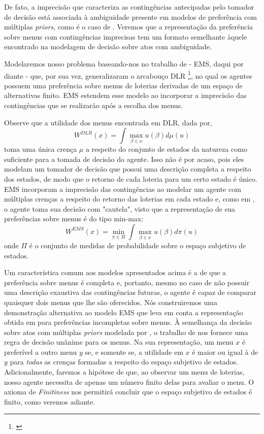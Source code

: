 \documentclass[11pt, a4paper]{article}
\theoremstyle{nonumberplain}
\theoremstyle{plain}
\theoremstyle{plain}
\theoremstyle{plain}
\begin{document}
De fato, a imprecisão que caracteriza as contingências antecipadas pelo tomador de decisão está associada à ambiguidade presente em modelos de preferência com múltiplas \emph{priors}, como é o caso de \cite{Gilboa1989}. Veremos que a representação da preferência sobre menus com contingências imprecisas tem um formato semelhante àquele encontrado na modelagem de decisão sobre atos com ambiguidade.   

Modelaremos nosso problema baseando-nos no trabalho de \cite{Epstein2007} - EMS, daqui por diante - que, por sua vez, generalizaram o arcabouço DLR \footnote{\cite{Dekel2001}}, no qual os agentes possuem uma preferência sobre menus de loterias derivadas de um espaço de alternativas finito. EMS estendem esse modelo ao incorporar a imprecisão das contingências que se realizarão após a escolha dos menus. 

Observe que a utilidade dos menus encontrada em DLR, dada por,               
$$ W^{DLR}(x)=\int \max_{\beta\in x}u(\beta)d\mu(u) $$
toma uma única crença $\mu$ a respeito do conjunto de estados da natureza como suficiente para a tomada de decisão do agente. Isso não é por acaso, pois eles modelam um tomador de decisão que possui uma descrição completa a respeito dos estados, de modo que o retorno de cada loteria para um certo estado é único. EMS incorporam a imprecisão das contingências ao modelar um agente com múltiplas crenças a respeito do retorno das loterias em cada estado e, como em \cite{Gilboa1989}, o agente toma sua decisão com "cautela", visto que a representação de sua preferências sobre menus é do tipo min-max: $$W^{EMS}(x)=\min_{\pi\in\Pi} \int \max_{\beta\in x}u(\beta)d\pi(u)$$ onde $\Pi$ é o conjunto de medidas de probabilidade sobre o espaço subjetivo de estados.

Um característica comum aos modelos apresentados acima é a de que a preferência sobre menus é completa e, portanto, mesmo no caso de não possuir uma descrição exaustiva das contingências futuras, o agente é capaz de comparar quaisquer dois menus que lhe são oferecidos. Nós construiremos uma demonstração alternativa ao modelo EMS que leva em conta a representação obtida em \cite{Kochov2007} para preferências incompletas sobre menus. À semelhança da decisão sobre atos com múltiplas \emph{priors} modelada por \cite{Gilboa2010}, o trabalho de \cite{Kochov2007} nos fornece uma regra de decisão unânime para os menus. Na sua representação, um menu $x$ é preferível a outro menu $y$ se, e somente se, a utilidade em $x$ é maior ou igual à de $y$ para \emph{todas} as crenças formadas a respeito do espaço subjetivo de estados. Adicionalmente, faremos a hipótese de que, ao observar um menu de loterias, nosso agente necessita de apenas um número finito delas para avaliar o menu. O axioma de \emph{Finitiness} nos permitirá concluir que o espaço subjetivo de estados é finito, como veremos adiante.
\end{document}
